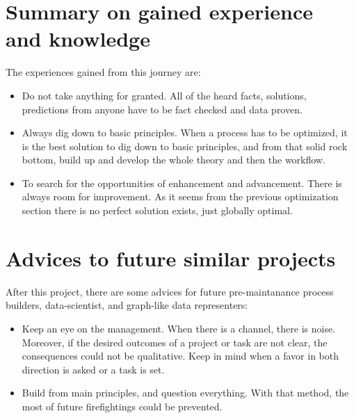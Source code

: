 \section{Summary on gained experience and knowledge}
The experiences gained from this journey are:
\begin{itemize}
	\item{Do not take anything for granted.} All of the heard facts, solutions, predictions from anyone have to be fact checked and data proven.
	\item{Always dig down to basic principles.} When a process has to be optimized, it is the best solution to dig down to basic principles, and from that solid rock bottom, build up and develop the whole theory and then the workflow.
	\item{To search for the opportunities of enhancement and advancement.} There is always room for improvement. As it seems from the previous optimization section there is no perfect solution exists, just globally optimal. 
\end{itemize}
\section{Advices to future similar projects}
After this project, there are some advices for future pre-maintanance process builders, data-scientist, and graph-like data representers:
\begin{itemize}
	\item{Keep an eye on the management.} When there is a channel, there is noise. Moreover, if the desired outcomes of a project or task are not clear, the consequences could not be qualitative. Keep in mind when a favor in both direction is asked or a task is set.
	\item{Build from main principles, and question everything.} With that method, the most of future firefightings could be prevented.
\end{itemize}